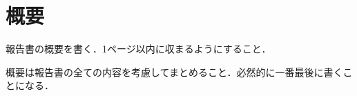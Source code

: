 ﻿%
\chapter*{概要}
\thispagestyle{empty}

報告書の概要を書く．1ページ以内に収まるようにすること．

概要は報告書の全ての内容を考慮してまとめること．必然的に一番最後に書くことになる．
